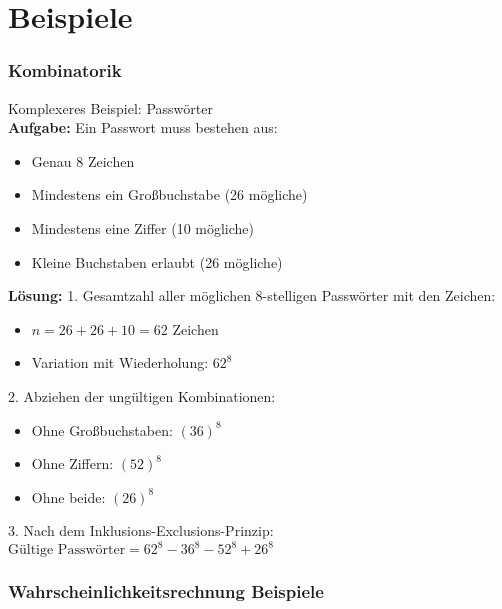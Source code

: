 \section{Beispiele}

\subsubsection{Kombinatorik}

\begin{example}{Komplexeres Beispiel: Passwörter}\\
\textbf{Aufgabe:} Ein Passwort muss bestehen aus:
\begin{itemize}
\item Genau 8 Zeichen
\item Mindestens ein Großbuchstabe (26 mögliche)
\item Mindestens eine Ziffer (10 mögliche)
\item Kleine Buchstaben erlaubt (26 mögliche)
\end{itemize}

\textbf{Lösung:}
1. Gesamtzahl aller möglichen 8-stelligen Passwörter mit den Zeichen:
   \begin{itemize}
   \item $n = 26 + 26 + 10 = 62$ Zeichen
   \item Variation mit Wiederholung: $62^8$
   \end{itemize}

2. Abziehen der ungültigen Kombinationen:
   \begin{itemize}
   \item Ohne Großbuchstaben: $(36)^8$
   \item Ohne Ziffern: $(52)^8$
   \item Ohne beide: $(26)^8$
   \end{itemize}

3. Nach dem Inklusions-Exclusions-Prinzip:
   $\text{Gültige Passwörter} = 62^8 - 36^8 - 52^8 + 26^8$
\end{example}

\subsubsection{Wahrscheinlichkeitsrechnung Beispiele}

